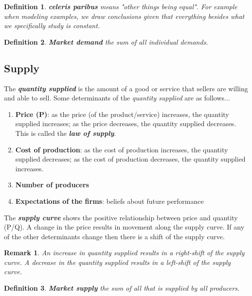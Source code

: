 \documentclass{article}
\newtheorem{definition}{Definition}[section]
\newtheorem*{remark}{Remark}
\newcommand{\bold}[1]{\textbf{#1}}
\newcommand{\define}[1]{\textbf{\textit{#1}}}
\begin{document}
\begin{definition}
  \define{celeris paribus} means "other things being equal". For example when modeling examples, we draw conclusions given that everything besides what we specifically study is constant. 
\end{definition}

\begin{definition}{\define{Market demand}}
  the sum of all individual demands. 
\end{definition}

\subsection{Supply}

The \define{quantity supplied} is the amount of a good or service that sellers are willing and able to sell. Some determinants of the \emph{quantity supplied} are as follows$\dots$

\begin{enumerate}
  \item \bold{Price (P)}: as the price (of the product/service) increases, the quantity supplied increases; as the price decreases, the quantity supplied decreases. This is called the \define{law of supply}. 
  \item \bold{Cost of production}: as the cost of production increases, the quantity supplied decreases; as the cost of production decreases, the quantity supplied increases. 
  \item \bold{Number of producers}
  \item \bold{Expectations of the firms}: beliefs about future performance
\end{enumerate}

The \define{supply curve} shows the positive relationship between price and quantity (P/Q). A change in the price results in movement along the supply curve. If any of the other determinants change then there is a shift of the supply curve. \\ 

\begin{remark}
  An increase in quantity supplied results in a \emph{right-shift} of the supply curve. A decrease in the quantity supplied results in a \emph{left-shift} of the supply curve. 
\end{remark}

\begin{definition}{\define{Market supply}}
  the sum of all that is supplied by all producers.
\end{definition}
\end{document}
